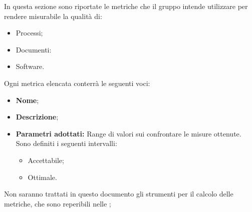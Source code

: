 In questa sezione sono riportate le metriche che il gruppo \gruppo \space intende utilizzare per rendere misurabile la qualità di:
\begin{itemize}
	\item Processi;
	\item Documenti:
	\item Software.
\end{itemize}

Ogni metrica elencata conterrà le seguenti voci:
\begin{itemize}
	\item \textbf{Nome};
	\item \textbf{Descrizione};
	\item \textbf{Parametri adottati: }Range di valori sui confrontare le misure ottenute. Sono definiti i seguenti intervalli:
	\begin{itemize}
		\item Accettabile;
		\item Ottimale.
	\end{itemize}		

\end{itemize}

Non saranno trattati in questo documento gli strumenti per il calcolo delle metriche, che sono reperibili nelle \NdP ;